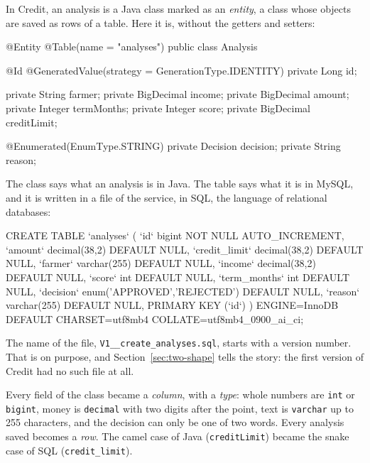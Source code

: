 In Credit, an analysis is a Java class marked as an \emph{entity}, a class
whose objects are saved as rows of a table. Here it is, without the getters
and setters:

\begin{code}
@Entity
@Table(name = "analyses")
public class Analysis {

	@Id
	@GeneratedValue(strategy = GenerationType.IDENTITY)
	private Long id;

	private String farmer;
	private BigDecimal income;
	private BigDecimal amount;
	private Integer termMonths;
	private Integer score;
	private BigDecimal creditLimit;

	@Enumerated(EnumType.STRING)
	private Decision decision;
	private String reason;
}
\end{code}

The class says what an analysis is in Java. The table says what it is in
MySQL, and it is written in a file of the service, in SQL, the language of
relational databases:

\begin{code}[language=SQL]
CREATE TABLE `analyses` (
  `id` bigint NOT NULL AUTO_INCREMENT,
  `amount` decimal(38,2) DEFAULT NULL,
  `credit_limit` decimal(38,2) DEFAULT NULL,
  `farmer` varchar(255) DEFAULT NULL,
  `income` decimal(38,2) DEFAULT NULL,
  `score` int DEFAULT NULL,
  `term_months` int DEFAULT NULL,
  `decision` enum('APPROVED','REJECTED') DEFAULT NULL,
  `reason` varchar(255) DEFAULT NULL,
  PRIMARY KEY (`id`)
) ENGINE=InnoDB DEFAULT CHARSET=utf8mb4 COLLATE=utf8mb4_0900_ai_ci;
\end{code}

The name of the file, \texttt{V1\_\_create\_analyses.sql}, starts with a
version number. That is on purpose, and Section~\ref{sec:two-shape} tells
the story: the first version of Credit had no such file at all.

Every field of the class became a \emph{column}, with a \emph{type}: whole
numbers are \texttt{int} or \texttt{bigint}, money is \texttt{decimal} with
two digits after the point, text is \texttt{varchar} up to 255 characters,
and the decision can only be one of two words. Every analysis saved becomes
a \emph{row}. The camel case of Java (\texttt{creditLimit}) became the snake
case of SQL (\texttt{credit\_limit}).

